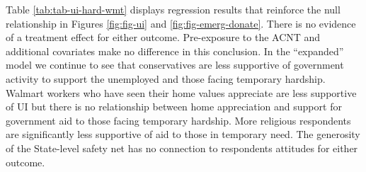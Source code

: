 \documentclass[
  11pt,
  oneside]{article}
\begin{document}
Table \ref{tab:tab-ui-hard-wmt} displays regression results that reinforce the null relationship in Figures \ref{fig:fig-ui} and \ref{fig:fig-emerg-donate}. There is no evidence of a treatment effect for either outcome. Pre-exposure to the ACNT and additional covariates make no difference in this conclusion. In the ``expanded'' model we continue to see that conservatives are less supportive of government activity to support the unemployed and those facing temporary hardship. Walmart workers who have seen their home values appreciate are less supportive of UI but there is no relationship between home appreciation and support for government aid to those facing temporary hardship. More religious respondents are significantly less supportive of aid to those in temporary need. The generosity of the State-level safety net has no connection to respondents attitudes for either outcome.
\end{document}
